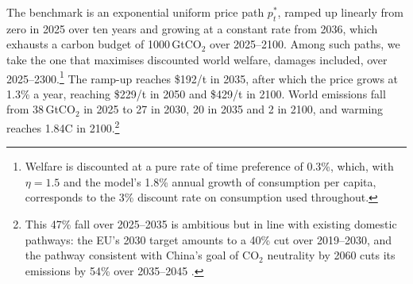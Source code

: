 \documentclass[12pt,english]{article}
\theoremstyle{remark}
\begin{document}
The benchmark is an exponential uniform price path $p^*_t$, ramped up linearly from zero in 2025 over ten years and growing at a constant rate from 2036, which exhausts a carbon budget of 1000\,GtCO$_2$ over 2025--2100. Among such paths, we take the one that maximises discounted world welfare, damages included, over 2025--2300.\footnote{Welfare is discounted at a pure rate of time preference of 0.3\%, which, with $\eta=1.5$ and the model's 1.8\% annual growth of consumption per capita, corresponds to the 3\% discount rate on consumption used throughout.} The ramp-up reaches \$192/t in 2035, after which the price grows at 1.3\% a year, reaching \$229/t in 2050 and \$429/t in 2100. World emissions fall from 38\,GtCO$_2$ in 2025 to 27 in 2030, 20 in 2035 and 2 in 2100, and warming reaches 1.84\textdegree C in 2100.\footnote{This 47\% fall over 2025--2035 is ambitious but in line with existing domestic pathways: the EU's 2030 target amounts to a 40\% cut over 2019--2030, and the pathway consistent with China's goal of CO$_2$ neutrality by 2060 cuts its emissions by 54\% over 2035--2045 \citep{du_toward_2026}.} 
\end{document}
